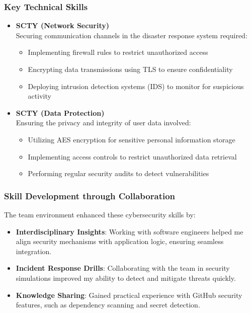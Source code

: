 \documentclass[a4paper, 11pt]{report}
\begin{document}
\subsubsection{Key Technical Skills}
\begin{itemize}
    \item \textbf{SCTY (Network Security)}~\cite{network_security} \\
    Securing communication channels in the disaster response system required:
    \begin{itemize}
        \item Implementing firewall rules to restrict unauthorized access
        \item Encrypting data transmissions using TLS to ensure confidentiality
        \item Deploying intrusion detection systems (IDS) to monitor for suspicious activity
    \end{itemize}

    \item \textbf{SCTY (Data Protection)}~\cite{data_protection} \\
    Ensuring the privacy and integrity of user data involved:
    \begin{itemize}
        \item Utilizing AES encryption for sensitive personal information storage
        \item Implementing access controls to restrict unauthorized data retrieval
        \item Performing regular security audits to detect vulnerabilities
    \end{itemize}
\end{itemize}

\subsubsection{Skill Development through Collaboration}
The team environment enhanced these cybersecurity skills by:
\begin{itemize}
    \item \textbf{Interdisciplinary Insights}: Working with software engineers helped me align security mechanisms with application logic, ensuring seamless integration.
    \item \textbf{Incident Response Drills}: Collaborating with the team in security simulations improved my ability to detect and mitigate threats quickly.
    \item \textbf{Knowledge Sharing}: Gained practical experience with GitHub security features, such as dependency scanning and secret detection.
\end{itemize}
\end{document}
